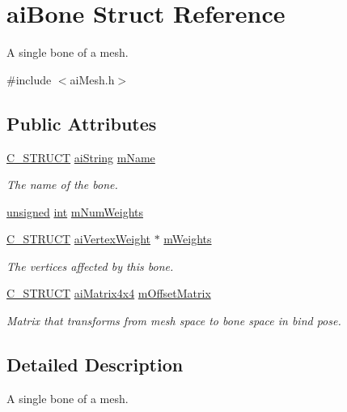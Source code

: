 \hypertarget{structai_bone}{\section{ai\-Bone Struct Reference}
\label{structai_bone}
}


A single bone of a mesh.  




{\ttfamily \#include $<$ai\-Mesh.\-h$>$}

\subsection*{Public Attributes}
\begin{DoxyCompactItemize}
\item 
\hyperlink{ai_defines_8h_ab51df4230ceb602bbc1bc109c432a6a0}{C\-\_\-\-S\-T\-R\-U\-C\-T} \hyperlink{structai_string}{ai\-String} \hyperlink{structai_bone_acfb9bfd2a2c6302181d7c3cc1bb8bbf0}{m\-Name}
\begin{DoxyCompactList}\small\item\em The name of the bone. \end{DoxyCompactList}\item 
\hyperlink{_free_image_8h_a425076c7067a1b5166e2cc530e914814}{unsigned} \hyperlink{wglew_8h_a500a82aecba06f4550f6849b8099ca21}{int} \hyperlink{structai_bone_a87a79d42a0132753aac66397ad6f9b71}{m\-Num\-Weights}
\item 
\hyperlink{ai_defines_8h_ab51df4230ceb602bbc1bc109c432a6a0}{C\-\_\-\-S\-T\-R\-U\-C\-T} \hyperlink{structai_vertex_weight}{ai\-Vertex\-Weight} $\ast$ \hyperlink{structai_bone_ade36319714b58c03ad46aae30a2724a4}{m\-Weights}
\begin{DoxyCompactList}\small\item\em The vertices affected by this bone. \end{DoxyCompactList}\item 
\hyperlink{ai_defines_8h_ab51df4230ceb602bbc1bc109c432a6a0}{C\-\_\-\-S\-T\-R\-U\-C\-T} \hyperlink{structai_matrix4x4}{ai\-Matrix4x4} \hyperlink{structai_bone_a1dd6c4f24a1384c05da281692be3e78d}{m\-Offset\-Matrix}
\begin{DoxyCompactList}\small\item\em Matrix that transforms from mesh space to bone space in bind pose. \end{DoxyCompactList}\end{DoxyCompactItemize}


\subsection{Detailed Description}
A single bone of a mesh. 


